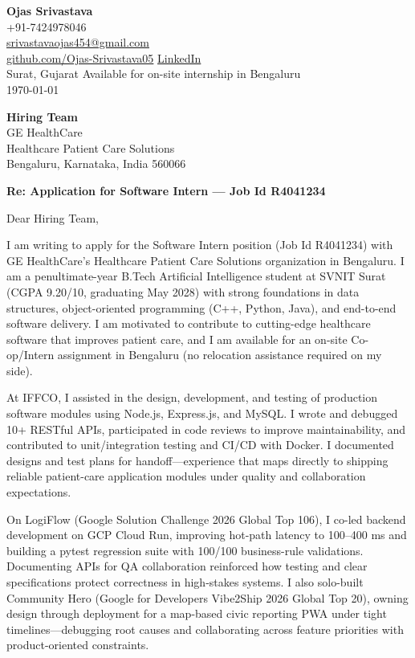 \documentclass[a4paper,11pt]{article}
\begin{document}
\begin{flushright}
\textbf{Ojas Srivastava} \\
+91-7424978046 \\
\href{mailto:srivastavaojas454@gmail.com}{srivastavaojas454@gmail.com} \\
\href{https://github.com/Ojas-Srivastava05}{github.com/Ojas-Srivastava05} \textbar{}
\href{https://linkedin.com/in/ojas-srivastava05}{LinkedIn} \\
Surat, Gujarat \textbar{} Available for on-site internship in Bengaluru \\
\today
\end{flushright}

\vspace{4mm}
\textbf{Hiring Team} \\
GE HealthCare \\
Healthcare Patient Care Solutions \\
Bengaluru, Karnataka, India 560066

\vspace{2mm}
\textbf{Re: Application for Software Intern --- Job Id R4041234}

Dear Hiring Team,

I am writing to apply for the Software Intern position (Job Id R4041234) with GE HealthCare's Healthcare Patient Care Solutions organization in Bengaluru. I am a penultimate-year B.Tech Artificial Intelligence student at SVNIT Surat (CGPA 9.20/10, graduating May 2028) with strong foundations in data structures, object-oriented programming (C++, Python, Java), and end-to-end software delivery. I am motivated to contribute to cutting-edge healthcare software that improves patient care, and I am available for an on-site Co-op/Intern assignment in Bengaluru (no relocation assistance required on my side).

At IFFCO, I assisted in the design, development, and testing of production software modules using Node.js, Express.js, and MySQL. I wrote and debugged 10+ RESTful APIs, participated in code reviews to improve maintainability, and contributed to unit/integration testing and CI/CD with Docker. I documented designs and test plans for handoff---experience that maps directly to shipping reliable patient-care application modules under quality and collaboration expectations.

On LogiFlow (Google Solution Challenge 2026 Global Top 106), I co-led backend development on GCP Cloud Run, improving hot-path latency to 100--400 ms and building a pytest regression suite with 100/100 business-rule validations. Documenting APIs for QA collaboration reinforced how testing and clear specifications protect correctness in high-stakes systems. I also solo-built Community Hero (Google for Developers Vibe2Ship 2026 Global Top 20), owning design through deployment for a map-based civic reporting PWA under tight timelines---debugging root causes and collaborating across feature priorities with product-oriented constraints.
\end{document}
